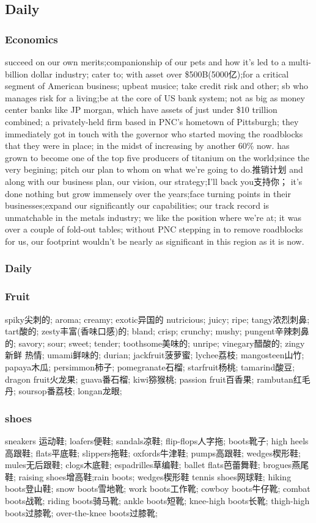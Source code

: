 \documentclass[a4paper,12pt]{article}
\begin{document}
\subsection{Daily}
\subsubsection{Economics}
succeed on our own merits;companionship of our pets and how it's led to a multi-billion dollar industry; cater to; with asset over \$500B(5000亿);for a critical segment of American business;
upbeat musice; take credit risk and other; sb who manages risk for a living;be at the core of US bank system; not as big as money center banks like JP morgan, which have assets of just under \$10 trillion combined;
a privately-held firm based in PNC's hometown of Pittsburgh; they immediately got in touch with the governor who started moving the roadblocks that they were in place; in the midst of increasing by another 60\% now.
has grown to become one of the top five producers of titanium on the world;since the very begining; pitch our plan to whom on what we're going to do.推销计划 and along with our business plan, our vision, our strategy;I'll back you支持你；
it's done nothing but grow immensely over the years;face turning points in their businesses;expand our significantly our capabilities;
our track record is unmatchable in the metals industry; we like the position where we're at; it was over a couple of fold-out tables;
without PNC stepping in to remove roadblocks for us, our footprint wouldn't be nearly as significant in this region as it is now.
\subsubsection{Daily}
\subsubsection{Fruit}
spiky尖刺的; aroma; creamy; exotic异国的 nutricious; juicy; ripe; tangy浓烈刺鼻; tart酸的; zesty丰富(香味口感)的; bland; crisp; crunchy; mushy; pungent辛辣刺鼻的; savory; sour; sweet; tender; toothsome美味的; unripe; vinegary醋酸的; zingy新鲜 热情; umami鲜味的;
durian; jackfruit菠萝蜜; lychee荔枝; mangosteen山竹; papaya木瓜; persimmon柿子; pomegranate石榴; starfruit杨桃; tamarind酸豆; dragon fruit火龙果; guava番石榴; kiwi猕猴桃; passion fruit百香果; rambutan红毛丹; soursop番荔枝; longan龙眼; 
\subsubsection{shoes}
sneakers 运动鞋; loafers便鞋; sandals凉鞋; flip-flops人字拖; boots靴子; high heels高跟鞋; flats平底鞋; slippers拖鞋; oxfords牛津鞋; pumps高跟鞋; wedges楔形鞋; mules无后跟鞋; clogs木底鞋; espadrilles草编鞋; ballet flats芭蕾舞鞋; brogues燕尾鞋; raising shoes增高鞋;rain boots; wedges楔形鞋 tennis shoes网球鞋; hiking boots登山鞋; snow boots雪地靴; work boots工作靴; cowboy boots牛仔靴; combat boots战靴; riding boots骑马靴; ankle boots短靴; knee-high boots长靴; thigh-high boots过膝靴; over-the-knee boots过膝靴;
\end{document}
